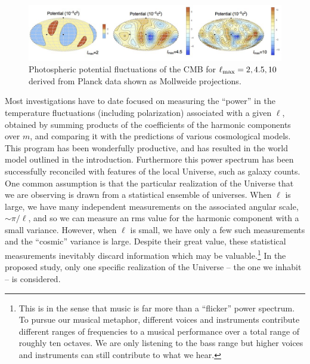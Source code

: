 \documentclass[psfig,12pt]{article}
\begin{document}
\begin{figure}[t]
\centering
\includegraphics[width=6in]{figures/nsffig2.jpg}
\caption{{\small Photospheric potential fluctuations of the CMB for
$\ell_{\rm max}=2,4.5,10$ derived from Planck data shown as Mollweide
projections.}}
\end{figure}

Most investigations have to date focused on measuring the ``power'' in the
temperature fluctuations (including polarization) associated with a
given $\ell$, obtained by summing products of the coefficients of the
harmonic components over $m$, and comparing it with the predictions of
various cosmological models. This program has been wonderfully
productive, and has resulted in the world model outlined in the introduction.
Furthermore this power spectrum has been successfully reconciled with
features of the local Universe, such as galaxy counts. One common
assumption is that the particular realization of the Universe that we
are observing is drawn from a statistical ensemble of universes. When
$\ell$ is large, we have many independent measurements on the associated
angular scale, $\sim\pi/\ell$, and so we can measure an rms value for
the harmonic component with a small variance. However, when $\ell$ is
small, we have only a few such measurements and the ``cosmic'' variance
is large. Despite their great value, these statistical measurements
inevitably discard information which may be valuable.\footnote{This is
in the sense that music is far more than a ``flicker'' power spectrum.
To pursue our musical metaphor, different voices and instruments
contribute different ranges of frequencies to a musical performance over
a total range of roughly ten octaves. We are only listening to the bass
range but higher voices and instruments can still contribute to what we
hear.}  In the proposed study, only one specific realization of the
Universe -- the one we inhabit --  is considered.
\end{document}
